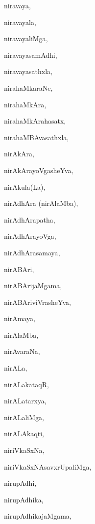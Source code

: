 \begin{multicols}{2}
{niravaya}, \pageref{niravaya}

{niravayala}, \pageref{niravayala}

{niravayaliMga}, \pageref{niravayaliMga}

{niravayasamAdhi}, \pageref{niravayasamAdhi}

{niravayasathxla}, \pageref{niravayasathxla}

{nirahaMkaraNe}, \pageref{nirahaMkaraNe}

{nirahaMkAra}, \pageref{nirahaMkAra}

{nirahaMkArahasatx}, \pageref{nirahaMkArahasatx}

{nirahaMBAvasathxla}, \pageref{nirahaMBAvasathxla}

{nirAkAra}, \pageref{nirAkAra}

{nirAkArayoVgasheYva}, \pageref{nirAkArayoVgasheYva}

{nirAkula(La)}, \pageref{nirAkulaLa}

{nirAdhAra (nirAlaMba)}, \pageref{nirAdhAra nirAlaMba}

{nirAdhArapatha}, \pageref{nirAdhArapatha}

{nirAdhArayoVga}, \pageref{nirAdhArayoVga}

{nirAdhArasamaya}, \pageref{nirAdhArasamaya}

{nirABAri}, \pageref{nirABAri}

{nirABArijaMgama}, \pageref{nirABArijaMgama}

{nirABAriviVrasheYva}, \pageref{nirABAriviVrasheYva}

{nirAmaya}, \pageref{nirAmaya}

{nirAlaMba}, \pageref{nirAlaMba}

{nirAvaraNa}, \pageref{nirAvaraNa}

{nirALa}, \pageref{nirALa}

{nirALakataqR}, \pageref{nirALakataqR}

{nirALatarxya}, \pageref{nirALatarxya}

{nirALaliMga}, \pageref{nirALaliMga}

{nirALAkaqti}, \pageref{nirALAkaqti}

{niriVkaSxNa}, \pageref{niriVkaSxNa}

{niriVkaSxNAsavxrUpaliMga}, \pageref{niriVkaSxNAsavxrUpaliMga}

{nirupAdhi}, \pageref{nirupAdhi}

{nirupAdhika}, \pageref{nirupAdhika}

{nirupAdhikajaMgama}, \pageref{nirupAdhikajaMgama}


\end{multicols}
